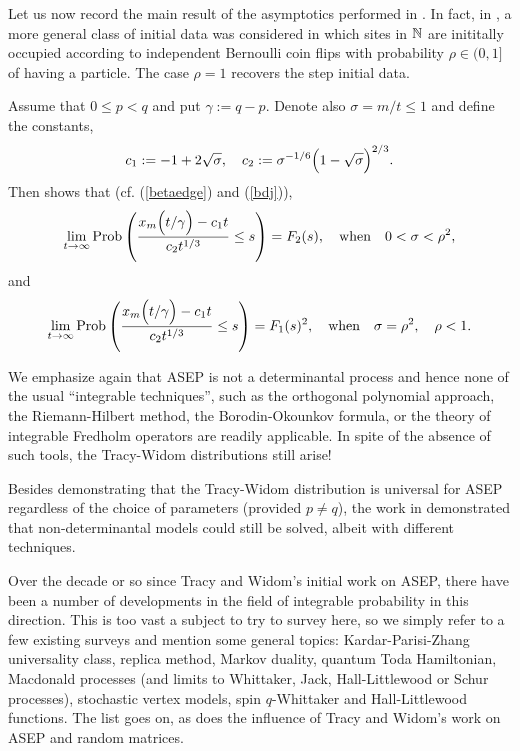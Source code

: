 \documentclass[11pt,letterpaper,reqno]{amsart}
\theoremstyle{definition}
\theoremstyle{remark}
\numberwithin{equation}{section}
\begin{document}
Let us now record the main result of the asymptotics performed in \cite{135}. In fact, in \cite{139}, a more general class of initial data was considered in which sites in ${\Bbb N}$ are inititally occupied according to independent Bernoulli coin flips with probability $\rho\in (0,1]$ of having a particle. The case $\rho=1$ recovers the step initial data.

Assume that $0\leq p < q$ and put $\gamma := q-p$. Denote also $\sigma =  m/t \leq 1$ and
define the constants,
$$
c_1 := -1 + 2\sqrt{\sigma}, \quad c_2 := \sigma^{-1/6}\Bigl(1 - \sqrt{\sigma}\Bigr)^{2/3}.
$$
Then \cite{135,139} shows that (cf.  (\ref{betaedge}) and (\ref{bdj})),
\begin{equation}\label{asep1}
\lim_{t \to \infty}\textrm{Prob}\left(\frac{x_m\Bigl(t/\gamma\Bigr) - c_1t}{c_2t^{1/3}} \leq s\right)
= F_2(s), \quad \textrm{when}\quad 0 < \sigma < \rho^2,
\end{equation}
and
\begin{equation}\label{asep2}
\lim_{t \to \infty}\textrm{Prob}\left(\frac{x_m\Bigl(t/\gamma\Bigr) - c_1t}{c_2t^{1/3}} \leq s\right)
= F_1(s)^2, \quad \textrm{when}\quad \sigma = \rho^2, \quad \rho < 1.
\end{equation}


We emphasize again that ASEP is not a determinantal process and hence none of
the usual ``integrable techniques'', such as the orthogonal
polynomial approach, the  Riemann-Hilbert method, the Borodin-Okounkov
formula, or the  theory of  integrable
Fredholm operators are readily applicable. In spite of the absence of such
tools,  the Tracy-Widom distributions still arise!

Besides demonstrating that the Tracy-Widom distribution is universal for ASEP regardless of the choice of parameters (provided $p\neq q$), the work in \cite{133,134,135} demonstrated that non-determinantal models could still be solved, albeit with different techniques.

Over the decade or so since Tracy and Widom's initial work on ASEP, there have been a number of developments in the field of integrable probability in this direction. This is too vast a subject to try to survey here, so we simply refer to a few existing surveys \cite{BorodinWheelerAggarwal, BorodinICM, BorodinGorin, BorodinPetrov1,BorodinPetrov2, BorodinWheeler, CorwinKPZ,  CorwinTwoASEP, CorwinICM,CorwinBAMS,OConnell,  QuastelSpohn, Zygouras1812.07204} and mention some general topics: Kardar-Parisi-Zhang universality class, replica method, Markov duality, quantum Toda Hamiltonian, Macdonald processes (and limits to Whittaker, Jack, Hall-Littlewood or Schur processes), stochastic vertex models, spin $q$-Whittaker and Hall-Littlewood functions. The list goes on, as does the influence of Tracy and Widom's work on ASEP and random matrices.
\end{document}
